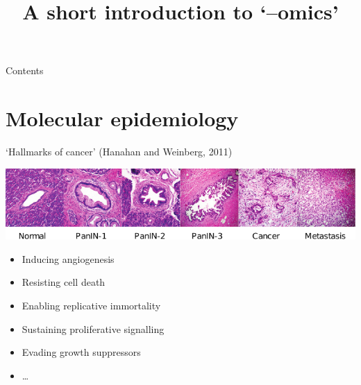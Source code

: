

\title{A short introduction to `--omics'}



\maketitle

\begin{frame}{Contents}
    \tableofcontents
\end{frame}

\section{Molecular epidemiology}

\begin{frame}{`Hallmarks of cancer' (Hanahan and Weinberg, 2011)}
    \begin{center}
        \includegraphics[width=\textwidth]{figures/pancreatic_cancer}
    \end{center}
    \vfill
    \begin{itemize}
        \item Inducing angiogenesis
        \item Resisting cell death
        \item Enabling replicative immortality
        \item Sustaining proliferative signalling
        \item Evading growth suppressors
        \item \ldots
    \end{itemize}
\end{frame}

